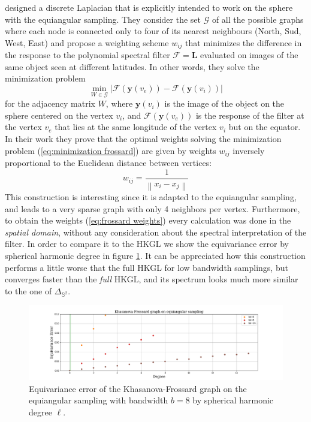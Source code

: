\documentclass{article} %
\newcommand{\norm}[1]{\left\lVert#1\right\rVert}
\begin{document}
\cite{khasanova2017graphomni} designed a discrete Laplacian that is explicitly intended to work on the sphere with the equiangular sampling. They consider the set $\mathcal G$ of all the possible graphs where each node is connected only to four of its nearest neighbours (North, Sud, West, East) and propose a weighting scheme $w_{ij}$ that minimizes the difference in the response to the polynomial spectral filter $\mathcal F = \mathbf L$ evaluated on images of the same object seen at different latitudes. In other words, they solve the minimization problem
\begin{equation} \label{eq:minimization frossard}
	\min_{W\in\mathcal G} \left|\mathcal{F}\left(\mathbf{y}\left(v_{ e}\right)\right)-\mathcal{F}\left(\mathbf{y}\left(v_{ i}\right)\right)\right|
\end{equation}
for the adjacency matrix $W$, where $\mathbf y(v_i)$ is the image of the object on the sphere centered on the vertex $v_i$, and $\mathcal F (\mathbf y(v_e))$ is the response of the filter at the vertex $v_e$ that lies at the same longitude of the vertex $v_i$ but on the equator. In their work they prove that the optimal weights solving the minimization problem (\ref{eq:minimization frossard}) are given by weights $w_{ij}$ inversely proportional to the Euclidean distance between vertices:
\begin{equation} \label{eq:frossard weights}
	w_{ij} = \frac{1}{\norm{x_i-x_j}}
\end{equation}
This construction is interesting since it is adapted to the equiangular sampling, and leads to a very sparse graph with only 4 neighbors per vertex. Furthermore, to obtain the weights (\ref{eq:frossard weights}) every calculation was done in the \textit{spatial domain}, without any consideration about the spectral interpretation of the filter. In order to compare it to the HKGL we show the equivariance error by spherical harmonic degree in figure \ref{fig:Equivariance error of the Frossard-Khasanove graph}. It can be appreciated how this construction performs a little worse that the full HKGL for low bandwidth samplings, but converges faster than the \textit{full} HKGL, and its spectrum looks much more similar to the one of $\Delta_{\mathbb S^2}$.

\begin{figure}
	\centering
	\includegraphics[width=\textwidth]{KhasanovaFrossardgraphonequiangularsampling.png}
	\caption{Equivariance error of the Khasanova-Frossard graph on the equiangular sampling with bandwidth $b=8$ by spherical harmonic degree $\ell$.}
	\label{fig:Equivariance error of the Frossard-Khasanove graph}
\end{figure}
\end{document}
